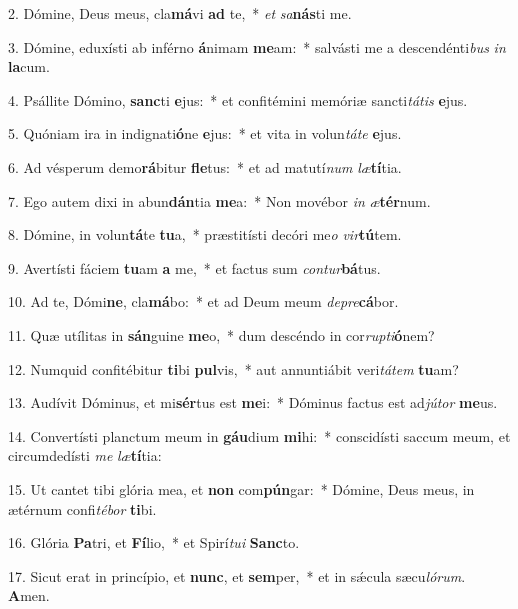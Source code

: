 2. Dómine, Deus meus, cla\textbf{má}vi \textbf{ad} te,~*  \textit{et} \textit{sa}\textbf{nás}ti me.\

3. Dómine, eduxísti ab inférno \textbf{á}nimam \textbf{me}am:~*  salvásti me a descendénti\textit{bus} \textit{in} \textbf{la}cum.\

4. Psállite Dómino, \textbf{sanc}ti \textbf{e}jus:~*  et confitémini memóriæ sancti\textit{tá}\textit{tis} \textbf{e}jus.\

5. Quóniam ira in indignati\textbf{ó}ne \textbf{e}jus:~*  et vita in volun\textit{tá}\textit{te} \textbf{e}jus.\

6. Ad vésperum demo\textbf{rá}bitur \textbf{fle}tus:~*  et ad matutí\textit{num} \textit{læ}\textbf{tí}tia.\

7. Ego autem dixi in abun\textbf{dán}tia \textbf{me}a:~*  Non movébor \textit{in} \textit{æ}\textbf{tér}num.\

8. Dómine, in volun\textbf{tá}te \textbf{tu}a,~*  præstitísti decóri me\textit{o} \textit{vir}\textbf{tú}tem.\

9. Avertísti fáciem \textbf{tu}am \textbf{a} me,~*  et factus sum \textit{con}\textit{tur}\textbf{bá}tus.\

10. Ad te, Dómi\textbf{ne}, cla\textbf{má}bo:~*  et ad Deum meum \textit{de}\textit{pre}\textbf{cá}bor.\

11. Quæ utílitas in \textbf{sán}guine \textbf{me}o,~*  dum descéndo in cor\textit{rup}\textit{ti}\textbf{ó}nem?\

12. Numquid confitébitur \textbf{ti}bi \textbf{pul}vis,~*  aut annuntiábit veri\textit{tá}\textit{tem} \textbf{tu}am?\

13. Audívit Dóminus, et mi\textbf{sér}tus est \textbf{me}i:~*  Dóminus factus est ad\textit{jú}\textit{tor} \textbf{me}us.\

14. Convertísti planctum meum in \textbf{gáu}dium \textbf{mi}hi:~*  conscidísti saccum meum, et circumdedísti \textit{me} \textit{læ}\textbf{tí}tia:\

15. Ut cantet tibi glória mea, et \textbf{non} com\textbf{pún}gar:~*  Dómine, Deus meus, in ætérnum confi\textit{té}\textit{bor} \textbf{ti}bi.\

16. Glória \textbf{Pa}tri, et \textbf{Fí}lio,~*  et Spirí\textit{tu}\textit{i} \textbf{Sanc}to.\

17. Sicut erat in princípio, et \textbf{nunc}, et \textbf{sem}per,~*  et in sǽcula sæcu\textit{ló}\textit{rum}. \textbf{A}men.\

